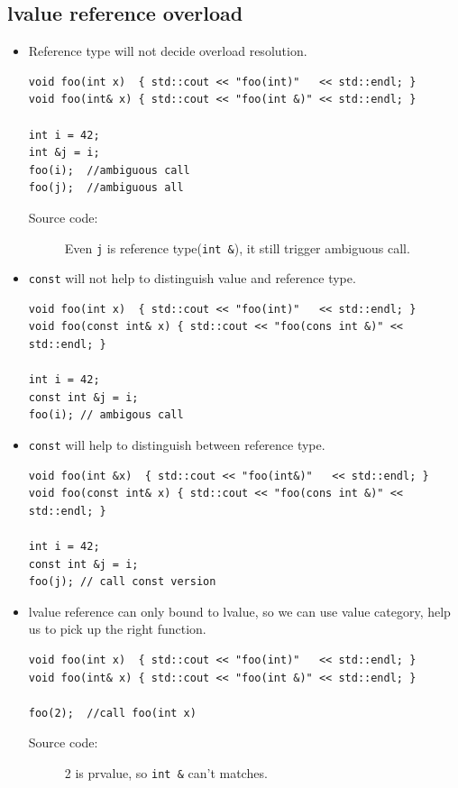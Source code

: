 \documentclass[a4paper,11pt,twoside]{book}
\begin{document}
\subsection{lvalue reference overload}
\begin{itemize}
		\item Reference type will not decide overload resolution.
\begin{lstlisting}[numbers=none]
void foo(int x)  { std::cout << "foo(int)"   << std::endl; }
void foo(int& x) { std::cout << "foo(int &)" << std::endl; }

int i = 42;
int &j = i;
foo(i);  //ambiguous call
foo(j);  //ambiguous all
\end{lstlisting}
\begin{description}
	\item[Source code:] Even \texttt{j} is reference type(\texttt{int \&}), it still trigger ambiguous call.
\end{description}

		\item \texttt{const} will not help to distinguish value and reference type.
\begin{lstlisting}[numbers=none]
void foo(int x)  { std::cout << "foo(int)"   << std::endl; }
void foo(const int& x) { std::cout << "foo(cons int &)" << std::endl; }

int i = 42;
const int &j = i;
foo(i); // ambigous call
\end{lstlisting}

	\item \texttt{const} will help to distinguish between reference type.
\begin{lstlisting}[numbers=none]
void foo(int &x)  { std::cout << "foo(int&)"   << std::endl; }
void foo(const int& x) { std::cout << "foo(cons int &)" << std::endl; }
	
int i = 42;
const int &j = i;
foo(j); // call const version
\end{lstlisting}


		\item lvalue reference can only bound to lvalue, so we can use value category, help us to pick up the right function.
\begin{lstlisting}[numbers=none]
void foo(int x)  { std::cout << "foo(int)"   << std::endl; }
void foo(int& x) { std::cout << "foo(int &)" << std::endl; }

foo(2);	 //call foo(int x)
\end{lstlisting}
\begin{description}
	\item[Source code:] 2 is prvalue, so \texttt{int \&} can't matches.
\end{description}



\end{itemize}
\end{document}
